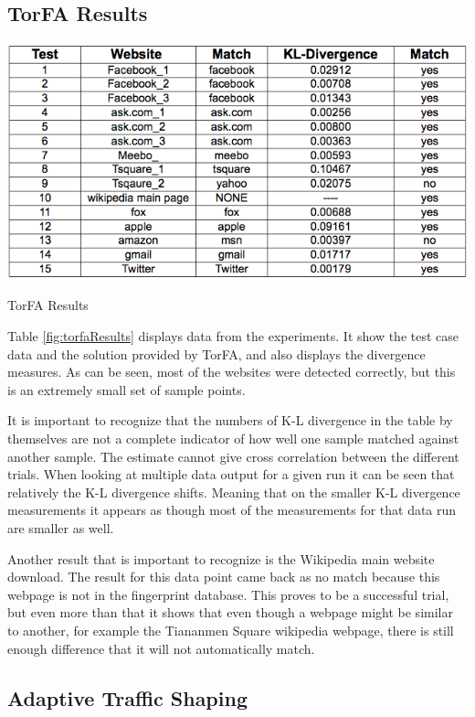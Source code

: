 \documentclass{usenixsubmit}
\begin{document}
\subsection{TorFA Results}
\begin{table}[h]
	\centering
		\includegraphics[scale=.6]{../finalpres/results.png}
	\caption{TorFA Results}
	\label{fig:torfaResults}
\end{table}
Table \ref{fig:torfaResults} displays data from the experiments. It show
the test case data and the solution provided by TorFA, and also displays
the divergence measures. As can be seen, most of the websites were detected 
correctly, but this is an extremely small set of sample points.

It is important to recognize that the numbers of K-L divergence in the table 
by themselves are not a complete indicator of how well one sample matched 
against another sample. The estimate cannot give cross correlation between 
the different trials. When looking at 
multiple data output for a given run it can be seen that relatively the K-L
divergence shifts. Meaning that on the smaller K-L divergence measurements
it appears as though most of the measurements for that data run are smaller 
as well.

Another result that is important to recognize is the Wikipedia main website
download. The result for this data point came back as no match because 
this webpage is not in the fingerprint database. This proves to be a successful
trial, but even more than that it shows that even though a webpage might be 
similar to another, for example the Tiananmen Square wikipedia webpage, there
is still enough difference that it will not automatically match. 

\subsection{Adaptive Traffic Shaping}
\end{document}
